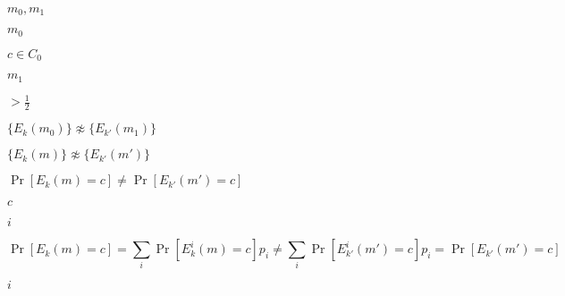 \documentclass[10pt]{book}
\begin{document}
\begin{mdSnippets}
\begin{mdInlineSnippet}[0b02be2105e9778833fb7fbd15244683]%
$m_0,m_1$\end{mdInlineSnippet}%
\begin{mdInlineSnippet}[fed1e4775925bd3f7af0c5d8fc47e4e6]%
$m_0$\end{mdInlineSnippet}%
\begin{mdInlineSnippet}[f60ab22314265c6d424232fb3cbb0fc7]%
$c \in C_0$\end{mdInlineSnippet}%
\begin{mdInlineSnippet}%
$m_1$\end{mdInlineSnippet}%
\begin{mdInlineSnippet}[ae7b1fad9dd5a16c565d57f74329ef51]%
$> \frac{1}{2}$\end{mdInlineSnippet}%
\begin{mdInlineSnippet}[fb62447339532c357ec52691c6aabe45]%
$\{ E_k(m_0) \} \not\approx \{E_{k'}(m_1) \}$\end{mdInlineSnippet}%
\begin{mdInlineSnippet}%
$\{E_k(m) \} \napprox \{E_{k'}(m')\}$\end{mdInlineSnippet}%
\begin{mdInlineSnippet}[d52d4fe05d068e89a7b457a590615d45]%
$\Pr[E_k(m) = c] \neq \Pr[E_{k'}(m') = c]$\end{mdInlineSnippet}%
\begin{mdInlineSnippet}[4a8a08f09d37b73795649038408b5f33]%
$c$\end{mdInlineSnippet}%
\begin{mdInlineSnippet}[865c0c0b4ab0e063e5caa3387c1a8741]%
$i$\end{mdInlineSnippet}%
\begin{mdDisplaySnippet}[5294ef6d98f8f8ec7f609675511735bf]%
\[%
\Pr[E_k(m) = c] = \sum_i \Pr[E^i_k(m) = c] p_i \neq \sum_{i} \Pr[E^i_{k'}(m') = c] p_i = \Pr[E_{k'}(m') = c]
\]%
\end{mdDisplaySnippet}%
\begin{mdInlineSnippet}[865c0c0b4ab0e063e5caa3387c1a8741]%
$i$\end{mdInlineSnippet}%

\end{mdSnippets}
\end{document}
